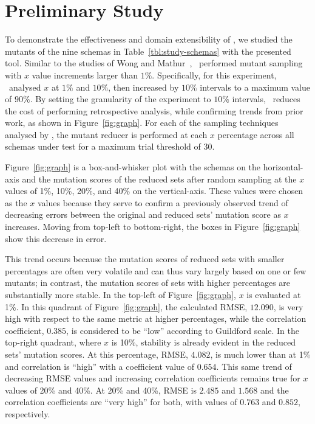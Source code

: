 \vspace*{-.25em}

\section{Preliminary Study}


To demonstrate the effectiveness and domain extensibility of \mrstudyr, we studied the mutants of the nine schemas in
Table~\ref{tbl:study-schemas} with the presented tool. Similar to the studies of Wong and Mathur~\cite{mathur1994empirical},
\mr~performed mutant sampling with $x$ value increments larger than $1\%$. Specifically, for this experiment, \mr~analysed
$x$ at $1\%$ and $10\%$, then increased by $10\%$ intervals to a maximum value of $90\%$. By setting the granularity of the
experiment to $10\%$ intervals, \mr~reduces the cost of performing retrospective analysis, while confirming trends from prior
work, as shown in Figure~\ref{fig:graph}. For each of the sampling techniques analysed by \mr, the mutant reducer is performed
at each $x$ percentage across all schemas under test for a maximum trial threshold of 30.


Figure~\ref{fig:graph} is a box-and-whisker plot with the schemas on the horizontal-axis and the mutation scores of the reduced
sets after random sampling at the $x$ values of 1\%, 10\%, 20\%, and 40\% on the vertical-axis.  These values were chosen as the
$x$ values because they serve to confirm a previously observed trend of decreasing errors between the original and reduced sets'
mutation score as $x$ increases. Moving from top-left to bottom-right, the boxes in Figure~\ref{fig:graph} show this decrease in
error.



This trend occurs because the mutation scores of reduced sets with smaller percentages are often very volatile and can
thus vary largely based on one or few mutants; in contrast, the mutation scores of sets with higher percentages are
substantially more stable. In the top-left of Figure~\ref{fig:graph}, $x$ is evaluated at 1\%. In this quadrant of
Figure~\ref{fig:graph}, the calculated RMSE, $12.090$, is very high with respect to the same metric at higher
percentages, while the correlation coefficient, $0.385$, is considered to be ``low'' according to Guildford scale. In
the top-right quadrant, where $x$ is 10\%, stability is already evident in the reduced sets' mutation scores. At this
percentage, RMSE, $4.082$, is much lower than at 1\% and correlation is ``high'' with a coefficient value of $0.654$.
This same trend of decreasing RMSE values and increasing correlation coefficients remains true for $x$ values of 20\%
and 40\%. At 20\% and 40\%, RMSE is $2.485$ and $1.568$ and the correlation coefficients are ``very high'' for both,
with values of $0.763$ and $0.852$, respectively.

